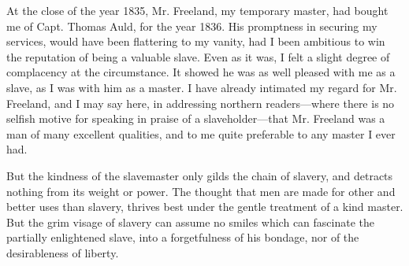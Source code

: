 At the close of the year 1835, Mr. Freeland, my temporary master, had
bought me of Capt. Thomas Auld, for the year 1836. His promptness in
securing my services, would have been flattering to my vanity, had I
been ambitious to win the reputation of being a valuable slave. Even as
it was, I felt a slight degree of complacency at the circumstance. It
showed he was as well pleased with me as a slave, as I was with him as a
master. I have already intimated my regard for Mr. Freeland, and I may
say here, in addressing northern readers---where there is no selfish
motive for speaking in praise of a slaveholder---that Mr. Freeland was a
man of many excellent qualities, and to me quite preferable to any
master I ever had.

But the kindness of the slavemaster only gilds the chain of slavery, and
detracts nothing from its weight or power. The thought that men are made
for other {}and better uses than slavery, thrives best under the gentle
treatment of a kind master. But the grim visage of slavery can assume no
smiles which can fascinate the partially enlightened slave, into a
forgetfulness of his bondage, nor of the desirableness of liberty.

